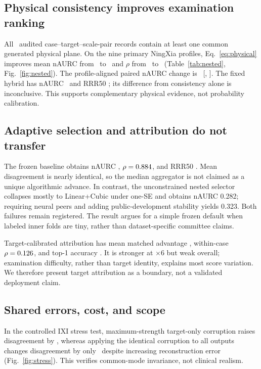 \documentclass{article}
\begin{document}
\subsection{Physical consistency improves examination ranking}
All \PhysicalMatchedRecords\ audited case--target--scale-pair records contain at least one common generated physical plane. On the nine primary NingXia profiles, Eq.~\eqref{eq:physical} improves mean nAURC from \NestedBaselineNAURC\ to \NestedTriageNAURC\ and $\rho$ from \NestedBaselineRho\ to \NestedTriageRho\ (Table~\ref{tab:nested}, Fig.~\ref{fig:nested}). The profile-aligned paired nAURC change is \NestedDeltaNAURC\ [\NestedDeltaNAURCLo, \NestedDeltaNAURCHi]. The fixed hybrid has nAURC \NestedLowNAURC\ and RRR50 \NestedLowRRR; its difference from consistency alone is inconclusive. This supports complementary physical evidence, not probability calibration.

\subsection{Adaptive selection and attribution do not transfer}
The frozen baseline obtains nAURC \NestedBaselineNAURC, $\rho=0.884$, and RRR50 \NestedBaselineRRR. Mean disagreement is nearly identical, so the median aggregator is not claimed as a unique algorithmic advance. In contrast, the unconstrained nested selector collapses mostly to Linear+Cubic under one-SE and obtains nAURC 0.282; requiring neural peers and adding public-development stability yields 0.323. Both failures remain registered. The result argues for a simple frozen default when labeled inner folds are tiny, rather than dataset-specific committee claims.

Target-calibrated attribution has mean matched advantage \NestedAttrAdv, within-case $\rho=0.126$, and top-1 accuracy \NestedAttrTop. It is stronger at $\times6$ but weak overall; examination difficulty, rather than target identity, explains most score variation. We therefore present target attribution as a boundary, not a validated deployment claim.

\subsection{Shared errors, cost, and scope}
In the controlled IXI stress test, maximum-strength target-only corruption raises disagreement by \StressTargetIncrease, whereas applying the identical corruption to all outputs changes disagreement by only \StressSharedChange\ despite increasing reconstruction error (Fig.~\ref{fig:stress}). This verifies common-mode invariance, not clinical realism.
\end{document}
